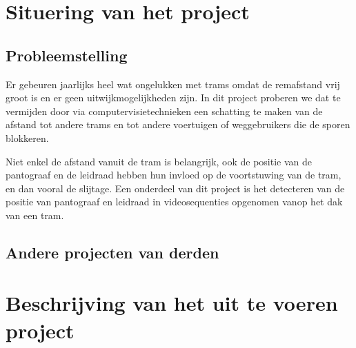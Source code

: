 \documentclass[]{book}
\begin{document}
\section{Situering van het project}\label{sec:Situering}

\subsection{Probleemstelling}\label{sec:Probleemstelling}

%

Er gebeuren jaarlijks heel wat ongelukken met trams omdat de remafstand vrij groot is en er geen uitwijkmogelijkheden zijn. In dit project proberen we dat te vermijden door via computervisietechnieken een schatting te maken van de afstand tot andere trams en tot andere voertuigen of weggebruikers die de sporen blokkeren. 

Niet enkel de afstand vanuit de tram is belangrijk, ook de positie van de pantograaf en de leidraad hebben hun invloed op de voortstuwing van de tram, en dan vooral de slijtage. Een onderdeel van dit project is het detecteren van de positie van pantograaf en leidraad in videosequenties opgenomen vanop het dak van een tram.

\subsection{Andere projecten van derden}\label{sec:Andere}



\section{Beschrijving van het uit te voeren project}\label{sec:Beschrijving}
\end{document}
